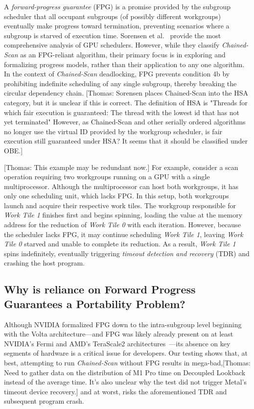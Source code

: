 \documentclass[sigconf]{acmart}
\newcommand{\thomas}[1]{{\footnotesize\color{orange}[Thomas: #1]}}
\begin{document}
A \emph{forward-progress guarantee} (FPG) is a promise provided by the subgroup scheduler that all occupant subgroups (of possibly different workgroups) eventually make progress toward termination, preventing scenarios where a subgroup is starved of execution time. Sorensen et al.~\cite{barriers, 1, 2} provide the most comprehensive analysis of GPU schedulers. However, while they classify \emph{Chained-Scan} as an FPG-reliant algorithm, their primary focus is in exploring and formalizing progress models, rather than their application to any one algorithm. In the context of \emph{Chained-Scan} deadlocking, FPG prevents condition 4b by prohibiting indefinite scheduling of any single subgroup, thereby breaking the circular dependency chain.
\thomas{Sorensen places Chained-Scan into the HSA category, but it is unclear if this is correct. The definition of HSA is \newline "Threads for which fair execution is guaranteed: The thread with the lowest id that has not yet terminated" \newline However, as Chained-Scan and other serially ordered algorithms no longer use the virtual ID provided by the workgroup scheduler, is fair execution still guaranteed under HSA? It seems that it should be classified under OBE.}

\thomas{This example may be redundant now.}
For example, consider a scan operation requiring two workgroups running on a GPU with a single multiprocessor. Although the multiprocessor can host both workgroups, it has only one scheduling unit, which lacks FPG\@. In this setup, both workgroups launch and acquire their respective work tiles. The workgroup responsible for \emph{Work Tile 1} finishes first and begins spinning, loading the value at the memory address for the reduction of \emph{Work Tile 0} with each iteration. However, because the scheduler lacks FPG, it may continue scheduling \emph{Work Tile 1}, leaving \emph{Work Tile 0} starved and unable to complete its reduction. As a result, \emph{Work Tile 1} spins indefinitely, eventually triggering \emph{timeout detection and recovery} (TDR) and crashing the host program.

\subsection{Why is reliance on Forward Progress Guarantees a Portability Problem?}
Although NVIDIA formalized FPG down to the intra-subgroup level beginning with the Volta architecture---and FPG was likely already present on at least NVIDIA's Fermi and AMD's TeraScale2 architectures~\cite{}---its absence on key segments of hardware is a critical issue for developers. Our testing shows that, at best, attempting to run \emph{Chained-Scan} without FPG results in mega-bad,\thomas{Need to gather data on the distribution of M1 Pro time on Decoupled Lookback instead of the average time. It's also unclear why the test did not trigger Metal's timeout device recovery.} and at worst, risks the aforementioned TDR and subsequent program crash.
\end{document}

